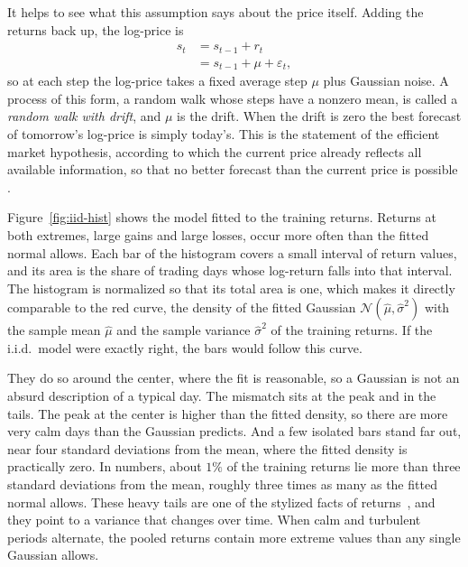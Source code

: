 It helps to see what this assumption says about the price itself. Adding the returns back up, the log-price is
\begin{equation}\label{eq:rw-drift}
\begin{aligned}
  s_t &= s_{t-1} + r_t \\
      &= s_{t-1} + \mu + \varepsilon_t ,
\end{aligned}
\end{equation}
so at each step the log-price takes a fixed average step $\mu$ plus Gaussian noise. A process of this form, a random walk whose steps have a nonzero mean, is called a \emph{random walk with drift}, and $\mu$ is the drift. When the drift is zero the best forecast of tomorrow's log-price is simply today's. This is the statement of the efficient market hypothesis, according to which the current price already reflects all available information, so that no better forecast than the current price is possible \cite[Ch.~3]{palomar:portfolio_optimization}.

Figure~\ref{fig:iid-hist} shows the model fitted to the training returns. Returns at both extremes, large gains and large losses, occur more often than the fitted normal allows. Each bar of the histogram covers a small interval of return values, and its area is the share of trading days whose log-return falls into that interval. The histogram is normalized so that its total area is one, which makes it directly comparable to the red curve, the density of the fitted Gaussian $\mathcal{N}(\hat{\mu}, \hat{\sigma}^2)$ with the sample mean $\hat{\mu}$ and the sample variance $\hat{\sigma}^2$ of the training returns. If the i.i.d.\ model were exactly right, the bars would follow this curve.

They do so around the center, where the fit is reasonable, so a Gaussian is not an absurd description of a typical day. The mismatch sits at the peak and in the tails. The peak at the center is higher than the fitted density, so there are more very calm days than the Gaussian predicts. And a few isolated bars stand far out, near four standard deviations from the mean, where the fitted density is practically zero. In numbers, about $1\%$ of the training returns lie more than three standard deviations from the mean, roughly three times as many as the fitted normal allows. These heavy tails are one of the stylized facts of returns~\cite[Ch.~2]{palomar:portfolio_optimization}, and they point to a variance that changes over time. When calm and turbulent periods alternate, the pooled returns contain more extreme values than any single Gaussian allows.

